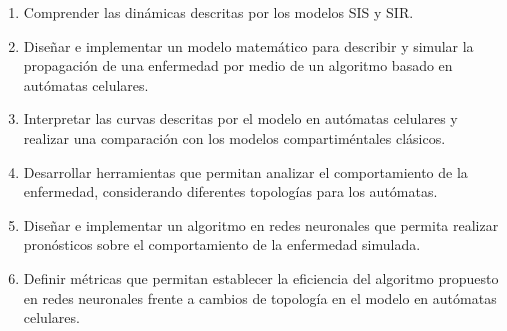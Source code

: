 
\begin{enumerate}
    \item Comprender las dinámicas descritas por los modelos SIS y SIR.
	\item Diseñar e implementar un modelo matemático para describir y simular la propagación de una enfermedad por medio de un algoritmo basado en autómatas celulares.
	\item Interpretar las curvas descritas por el modelo en autómatas celulares y realizar una comparación con los modelos compartiméntales clásicos.
	\item Desarrollar herramientas que permitan analizar el comportamiento de la enfermedad, considerando diferentes topologías para los autómatas.
    \item Diseñar e implementar un algoritmo en redes neuronales que permita realizar pronósticos sobre el comportamiento de la enfermedad simulada.
    \item Definir métricas que permitan establecer la eficiencia del algoritmo propuesto en redes neuronales frente a cambios de topología en el modelo en autómatas celulares.
\end{enumerate}